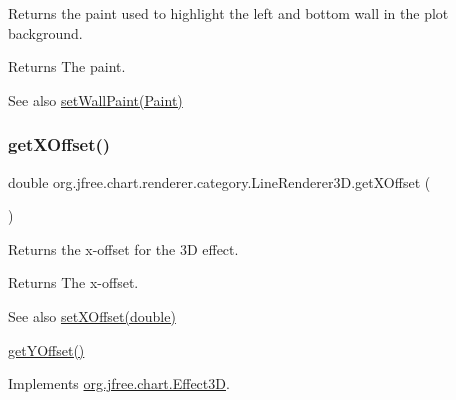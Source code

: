 Returns the paint used to highlight the left and bottom wall in the plot background.

\begin{DoxyReturn}{Returns}
The paint.
\end{DoxyReturn}
\begin{DoxySeeAlso}{See also}
\mbox{\hyperlink{classorg_1_1jfree_1_1chart_1_1renderer_1_1category_1_1_line_renderer3_d_a536e0183a3e0f39f28bb026b2baad93c}{set\+Wall\+Paint(\+Paint)}} 
\end{DoxySeeAlso}
\mbox{\label{classorg_1_1jfree_1_1chart_1_1renderer_1_1category_1_1_line_renderer3_d_ad4ec91cbd2dd6ec17a01be964f076ad1}} 
\subsubsection{\texorpdfstring{get\+X\+Offset()}{getXOffset()}}
{\footnotesize\ttfamily double org.\+jfree.\+chart.\+renderer.\+category.\+Line\+Renderer3\+D.\+get\+X\+Offset (\begin{DoxyParamCaption}{ }\end{DoxyParamCaption})}

Returns the x-\/offset for the 3D effect.

\begin{DoxyReturn}{Returns}
The x-\/offset.
\end{DoxyReturn}
\begin{DoxySeeAlso}{See also}
\mbox{\hyperlink{classorg_1_1jfree_1_1chart_1_1renderer_1_1category_1_1_line_renderer3_d_ada06deb5c7f08ef5f6cb476cd8a08341}{set\+X\+Offset(double)}} 

\mbox{\hyperlink{classorg_1_1jfree_1_1chart_1_1renderer_1_1category_1_1_line_renderer3_d_aeaf2b0eef57a0a0b9dbcf5b56af1c5fa}{get\+Y\+Offset()}} 
\end{DoxySeeAlso}


Implements \mbox{\hyperlink{interfaceorg_1_1jfree_1_1chart_1_1_effect3_d_af4f9829925a6d38170d817afd2486f90}{org.\+jfree.\+chart.\+Effect3D}}.

\mbox{\label{classorg_1_1jfree_1_1chart_1_1renderer_1_1category_1_1_line_renderer3_d_aeaf2b0eef57a0a0b9dbcf5b56af1c5fa}} 

